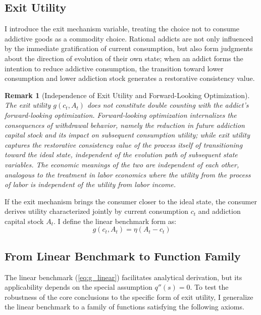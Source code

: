 \documentclass[12pt]{article}
\newtheorem{remark}{Remark}
\begin{document}
\subsection*{Exit Utility}
 
I introduce the exit mechanism variable, treating the choice not to consume addictive goods as a commodity choice.
Rational addicts are not only influenced by the immediate gratification of current consumption, but also form judgments about the direction of evolution of their own state;
when an addict forms the intention to reduce addictive consumption, the transition toward lower consumption and lower addiction stock generates a
restorative consistency value.

\begin{remark}[Independence of Exit Utility and Forward-Looking Optimization]
The exit utility $g(c_t, A_t)$ does not constitute double counting with the addict's forward-looking optimization.
Forward-looking optimization internalizes the \emph{consequences} of withdrawal behavior, namely the reduction in future addiction capital stock
and its impact on subsequent consumption utility; while exit utility captures the restorative consistency value of the \emph{process itself} of transitioning toward the ideal state,
independent of the evolution path of subsequent state variables.
The economic meanings of the two are independent of each other, analogous to the treatment in labor economics where the utility from the \emph{process} of labor is independent of
the utility from labor \emph{income}.
\end{remark}

If the exit mechanism brings the consumer closer to the ideal state, the consumer derives utility characterized jointly by current consumption $c_t$ and addiction capital stock
$A_t$. I define the linear benchmark form as:
\begin{equation}
    g(c_t, A_t) = \eta(A_t-c_t)
    \label{eq:g_linear}
\end{equation}

\subsection*{From Linear Benchmark to Function Family}
 
The linear benchmark (\ref{eq:g_linear}) facilitates analytical derivation, but its applicability depends on
the special assumption $q''(s) = 0$. To test the robustness of the core conclusions to the specific form of exit utility,
I generalize the linear benchmark to a family of functions satisfying the following axioms.
\end{document}
